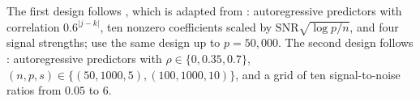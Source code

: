 The first design follows \citet[Sec.~4.1 and Table~1]{GriffinLatuszynskiSteel2021}, %
which is adapted from \citet[Sec.~3.4.1]{YangWainwrightJordan2016}: %
autoregressive predictors with correlation $0.6^{\lvert j-k\rvert}$, ten nonzero coefficients scaled by
$\mathrm{SNR}\sqrt{\log p/n}$, and four signal strengths; \citet[Sec.~5.1]{LiangLivingstoneGriffin2022} use the same %
design up to $p=50{,}000$.
The second design follows \citet[Sec.~3.1]{HastieTibshiraniTibshirani2020}: %
autoregressive predictors with $\rho\in\{0,0.35,0.7\}$, $(n,p,s)\in\{(50,1000,5),(100,1000,10)\}$, and a grid of ten
signal-to-noise ratios from $0.05$ to $6$.
